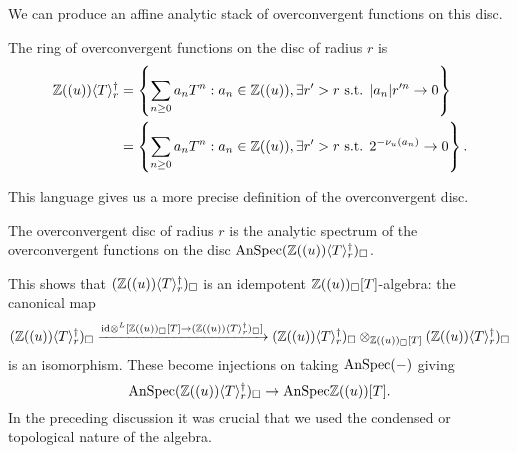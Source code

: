 We can produce an affine analytic stack of overconvergent functions on this disc. 
\begin{definition}\label{def: overconvergent functions on the disc}
    The ring of overconvergent functions on the disc of radius $r$ is 
    \begin{align*}
        \mathbb{Z}((u))\langle T\rangle_{r}^{\dagger} &= \left\{\sum_{n\geq0}a_{n}T^{n}:a_{n}\in\mathbb{Z}((u)),\exists r'>r\text{ s.t. }|a_{n}|r'^{n}\to0\right\} \\
        &= \left\{\sum_{n\geq0}a_{n}T^{n}:a_{n}\in\mathbb{Z}((u)),\exists r'>r\text{ s.t. }2^{-\nu_{u}(a_{n})}\to0\right\}.
    \end{align*}
\end{definition}
This language gives us a more precise definition of the overconvergent disc. 
\begin{definition}\label{def: overconvergent disc}
    The overconvergent disc of radius $r$ is the analytic spectrum of the overconvergent functions on the disc $\mathrm{AnSpec}(\mathbb{Z}((u))\langle T\rangle_{r}^{\dagger})_{\square}$. 
\end{definition}
This shows that $(\mathbb{Z}((u))\langle T\rangle_{r}^{\dagger})_{\square}$ is an idempotent $\mathbb{Z}((u))_{\square}[T]$-algebra: the canonical map 
$$(\mathbb{Z}((u))\langle T\rangle_{r}^{\dagger})_{\square}\xrightarrow{\mathrm{id}\otimes^{L}[\mathbb{Z}((u))_{\square}[T]\to(\mathbb{Z}((u))\langle T\rangle_{r}^{\dagger})_{\square}]}(\mathbb{Z}((u))\langle T\rangle_{r}^{\dagger})_{\square}\otimes_{\mathbb{Z}((u))_{\square}[T]}(\mathbb{Z}((u))\langle T\rangle_{r}^{\dagger})_{\square}$$ 
is an isomorphism. These become injections on taking $\mathrm{AnSpec}(-)$ giving $$\mathrm{AnSpec}(\mathbb{Z}((u))\langle T\rangle_{r}^{\dagger})_{\square}\to\mathrm{AnSpec}\mathbb{Z}((u))[T].$$
In the preceding discussion it was crucial that we used the condensed or topological nature of the algebra. 

